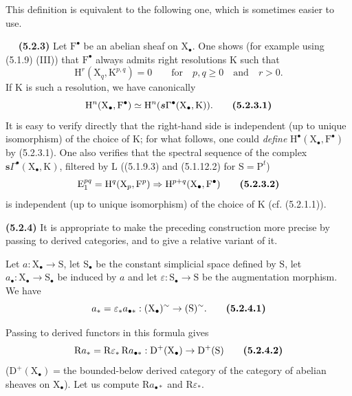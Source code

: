 \documentclass[11pt,leqno]{article}
\newcommand{\Page}[1]{\ifvmode\noindent\else\unskip\ \fi{\footnotesize\textcolor{gray}{[p.\,#1]}}\ \ignorespaces}
\begin{document}
This definition is equivalent to the following one, which is sometimes easier to use.

\Page{13}
\textbf{(5.2.3)} Let \(\mathrm{F}^{\bullet}\) be an abelian sheaf on \(\mathrm{X}_{\bullet}\). One shows (for example using (5.1.9) (III)) that \(\mathrm{F}^{\bullet}\) always admits right resolutions \(\mathrm{K}\) such that
\[
\mathrm{H}^{r}(\mathrm{X}_{q},\mathrm{K}^{p,q})=0
\qquad \text{for}\quad p,q\geq 0
\quad\text{and}\quad r>0.
\]
If \(\mathrm{K}\) is such a resolution, we have canonically
\[
\mathrm{H}^{n}(\mathrm{X}_{\bullet},\mathrm{F}^{\bullet})
\simeq
\mathrm{H}^{n}(\boldsymbol{s}\Gamma^{\bullet}(\mathrm{X}_{\bullet},\mathrm{K})).
\tag*{\textbf{(5.2.3.1)}}
\]
It is easy to verify directly that the right-hand side is independent (up to unique isomorphism) of the choice of \(\mathrm{K}\); for what follows, one could \textit{define} \(\mathrm{H}^{\bullet}(\mathrm{X}_{\bullet},\mathrm{F}^{\bullet})\) by (5.2.3.1). One also verifies that the spectral sequence of the complex \(\boldsymbol{s}\Gamma^{\bullet}(\mathrm{X}_{\bullet},\mathrm{K})\), filtered by \(\mathrm{L}\) ((5.1.9.3) and (5.1.12.2) for \(\mathrm{S}=\mathrm{P}^{t}\))
\[
\mathrm{E}_{1}^{pq}=\mathrm{H}^{q}(\mathrm{X}_{p},\mathrm{F}^{p})
\Rightarrow
\mathrm{H}^{p+q}(\mathrm{X}_{\bullet},\mathrm{F}^{\bullet})
\tag*{\textbf{(5.2.3.2)}}
\]
is independent (up to unique isomorphism) of the choice of \(\mathrm{K}\) (cf. (5.2.1.1)).

\textbf{(5.2.4)} It is appropriate to make the preceding construction more precise by passing to derived categories, and to give a relative variant of it.

Let \(a:\mathrm{X}_{\bullet}\to\mathrm{S}\), let \(\mathrm{S}_{\bullet}\) be the constant simplicial space defined by \(\mathrm{S}\), let \(a_{\bullet}:\mathrm{X}_{\bullet}\to\mathrm{S}_{\bullet}\) be induced by \(a\) and let \(\varepsilon:\mathrm{S}_{\bullet}\to\mathrm{S}\) be the augmentation morphism. We have
\[
a_*=\varepsilon_*a_{\bullet *}:
(\mathrm{X}_{\bullet})^{\sim}\to(\mathrm{S})^{\sim}.
\tag*{\textbf{(5.2.4.1)}}
\]

Passing to derived functors in this formula gives
\[
\mathrm{R}a_*=\mathrm{R}\varepsilon_*\,\mathrm{R}a_{\bullet *}:
\mathrm{D}^{+}(\mathrm{X}_{\bullet})\to\mathrm{D}^{+}(\mathrm{S})
\tag*{\textbf{(5.2.4.2)}}
\]
(\(\mathrm{D}^{+}(\mathrm{X}_{\bullet})=\)the bounded-below derived category of the category of abelian sheaves on \(\mathrm{X}_{\bullet}\)). Let us compute \(\mathrm{R}a_{\bullet *}\) and \(\mathrm{R}\varepsilon_*\).
\end{document}
